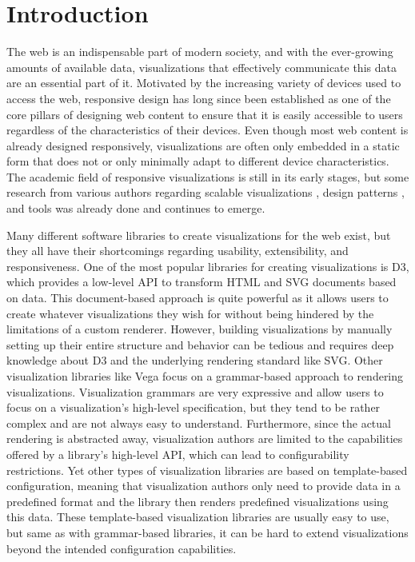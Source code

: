 \chapter{Introduction}
\label{chap:Introduction}

The web is an indispensable part of modern society, and with the
ever-growing amounts of available data, visualizations that
effectively communicate this data are an essential part of it.
Motivated by the increasing variety of devices used to access the web,
responsive design has long since been established as one of the core
pillars of designing web content to ensure that it is easily
accessible to users regardless of the characteristics of their
devices.  Even though most web content is already designed
responsively, visualizations are often only embedded in a static form
that does not or only minimally adapt to different device
characteristics.  The academic field of responsive visualizations is
still in its early stages, but some research from various authors
regarding scalable visualizations
\parencite{BuildingRespDataVisForTheWeb, LearningRespDataVis}, design
patterns \parencite{RespVis, TechniquesForFlexibleRespVisDesign,
  DesignPatternsTradeOffsRespVis}, and tools
\parencite{TechniquesForFlexibleRespVisDesign} was already done and
continues to emerge.

Many different software libraries to create visualizations for the web
exist, but they all have their shortcomings regarding usability,
extensibility, and responsiveness.  One of the most popular libraries
for creating visualizations is D3, which provides a low-level API to
transform HTML and SVG documents based on data.  This document-based
approach is quite powerful as it allows users to create whatever
visualizations they wish for without being hindered by the limitations
of a custom renderer.  However, building visualizations by manually
setting up their entire structure and behavior can be tedious and
requires deep knowledge about D3 and the underlying rendering standard
like SVG.  Other visualization libraries like Vega \parencite{Vega}
focus on a grammar-based approach to rendering visualizations.
Visualization grammars are very expressive and allow users to focus on
a visualization's high-level specification, but they tend to be rather
complex and are not always easy to understand.  Furthermore, since the
actual rendering is abstracted away, visualization authors are limited
to the capabilities offered by a library's high-level API, which can
lead to configurability restrictions.  Yet other types of
visualization libraries are based on template-based configuration,
meaning that visualization authors only need to provide data in a
predefined format and the library then renders predefined
visualizations using this data.  These template-based visualization
libraries are usually easy to use, but same as with grammar-based
libraries, it can be hard to extend visualizations beyond the intended
configuration capabilities.

